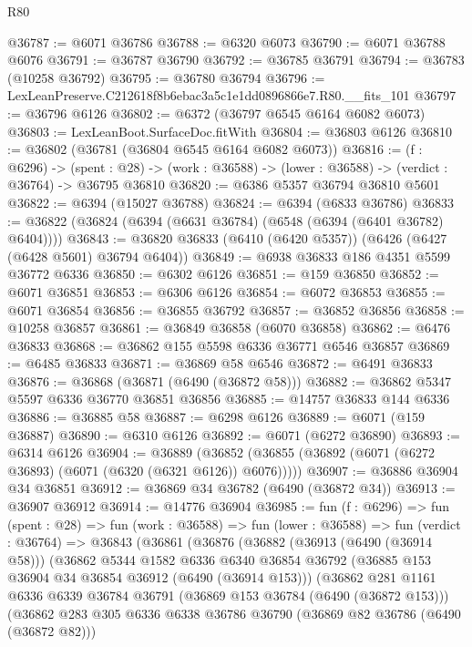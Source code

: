 \begin{lexlean}{R80}
\begin{coremodule}
@36787 := @6071 @36786
@36788 := @6320 @6073
@36790 := @6071 @36788 @6076
@36791 := @36787 @36790
@36792 := @36785 @36791
@36794 := @36783 (@10258 @36792)
@36795 := @36780 @36794
@36796 := LexLeanPreserve.C212618f8b6ebac3a5c1e1dd0896866e7.R80.__fits_101
@36797 := @36796 @6126
@36802 := @6372 (@36797 @6545 @6164 @6082 @6073)
@36803 := LexLeanBoot.SurfaceDoc.fitWith
@36804 := @36803 @6126
@36810 := @36802 (@36781 (@36804 @6545 @6164 @6082 @6073))
@36816 := (f : @6296) ->
  (spent : @28) -> (work : @36588) -> (lower : @36588) -> (verdict : @36764) -> @36795 @36810
@36820 := @6386 @5357 @36794 @36810 @5601
@36822 := @6394 (@15027 @36788)
@36824 := @6394 (@6833 @36786)
@36833 := @36822 (@36824 (@6394 (@6631 @36784) (@6548 (@6394 (@6401 @36782) @6404))))
@36843 := @36820 @36833 (@6410 (@6420 @5357)) (@6426 (@6427 (@6428 @5601) @36794 @6404))
@36849 := @6938 @36833 @186 @4351 @5599 @36772 @6336
@36850 := @6302 @6126
@36851 := @159 @36850
@36852 := @6071 @36851
@36853 := @6306 @6126
@36854 := @6072 @36853
@36855 := @6071 @36854
@36856 := @36855 @36792
@36857 := @36852 @36856
@36858 := @10258 @36857
@36861 := @36849 @36858 (@6070 @36858)
@36862 := @6476 @36833
@36868 := @36862 @155 @5598 @6336 @36771 @6546 @36857
@36869 := @6485 @36833
@36871 := @36869 @58 @6546
@36872 := @6491 @36833
@36876 := @36868 (@36871 (@6490 (@36872 @58)))
@36882 := @36862 @5347 @5597 @6336 @36770 @36851 @36856
@36885 := @14757 @36833 @144 @6336
@36886 := @36885 @58
@36887 := @6298 @6126
@36889 := @6071 (@159 @36887)
@36890 := @6310 @6126
@36892 := @6071 (@6272 @36890)
@36893 := @6314 @6126
@36904 := @36889
    (@36852 (@36855 (@36892 (@6071 (@6272 @36893) (@6071 (@6320 (@6321 @6126)) @6076)))))
@36907 := @36886 @36904 @34 @36851
@36912 := @36869 @34 @36782 (@6490 (@36872 @34))
@36913 := @36907 @36912
@36914 := @14776 @36904
@36985 := fun (f : @6296) =>
  fun (spent : @28) =>
  fun (work : @36588) =>
  fun (lower : @36588) =>
  fun (verdict : @36764) =>
  @36843
    (@36861
      (@36876
        (@36882
          (@36913 (@6490 (@36914 @58)))
          (@36862
            @5344
            @1582
            @6336
            @6340
            @36854
            @36792
            (@36885 @153 @36904 @34 @36854 @36912 (@6490 (@36914 @153)))
            (@36862
              @281
              @1161
              @6336
              @6339
              @36784
              @36791
              (@36869 @153 @36784 (@6490 (@36872 @153)))
              (@36862
                @283
                @305
                @6336
                @6338
                @36786
                @36790
                (@36869 @82 @36786 (@6490 (@36872 @82)))

\end{coremodule}
\end{lexlean}

